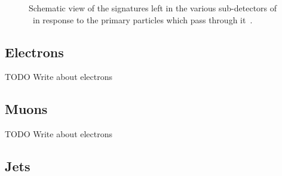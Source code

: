 \begin{figure}[ht]
  \caption{
    Schematic view of the signatures left in the various sub-detectors of
    \atlas\ in response to the primary particles which pass through
    it~\cite{Pequenao:1505342}.
  }
  \label{fig:particle_signatures}
\end{figure}

\FloatBarrier
\subsection{Electrons} 
\label{sec:elctrons}

{\color{red} TODO Write about electrons}

\FloatBarrier
\subsection{Muons} 
\label{sec:muons}

{\color{red} TODO Write about electrons}

\FloatBarrier
\subsection{Jets} 
\label{sec:jets}

